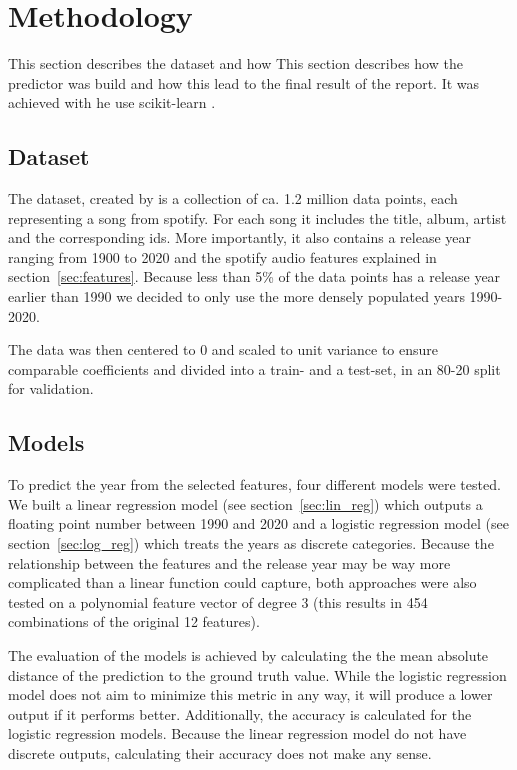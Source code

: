 \documentclass{article}
\begin{document}
\section{Methodology}
This section describes the dataset and how 
This section describes how the predictor was build and how this lead to the final result of the report. It was achieved with he use scikit-learn \citep{sklearn}.

\subsection{Dataset}\label{sec:dataset}

The dataset, created by \citet{dataset} is a collection of ca. 1.2 million data points, each representing a song from spotify. For each song it includes the title, album, artist and the corresponding ids. More importantly, it also contains a release year ranging from 1900 to 2020 and the spotify audio features explained in section~\ref{sec:features}. Because less than 5\% of the data points has a release year earlier than 1990 we decided to only use the more densely populated years 1990-2020.

The data was then centered to 0 and scaled to unit variance to ensure comparable coefficients and divided into a train- and a test-set, in an 80-20 split for validation.

\subsection{Models}

To predict the year from the selected features, four different models were tested. We built a linear regression model (see section~\ref{sec:lin_reg}) which outputs a floating point number between 1990 and 2020 and a logistic regression model (see section~\ref{sec:log_reg}) which treats the years as discrete categories. Because the relationship between the features and the release year may be way more complicated than a linear function could capture, both approaches were also tested on a polynomial feature vector of degree 3 (this results in 454 combinations of the original 12 features). 

The evaluation of the models is achieved by calculating the the mean absolute distance of the prediction to the ground truth value. While the logistic regression model does not aim to minimize this metric in any way, it will produce a lower output if it performs better. Additionally, the accuracy is calculated for the logistic regression models. Because the linear regression model do not have discrete outputs, calculating their accuracy does not make any sense. 
\end{document}
